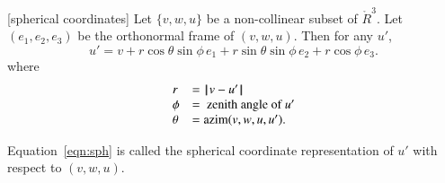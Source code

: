 \begin{lemma}[spherical coordinates]\label{lemma:sph}
Let $\{v,w,u\}$ %
be a non-collinear subset of $\ring{R}^3$.
Let $(e_1,e_2,e_3)$ be the orthonormal frame of $(v,w,u)$.
  Then for any $u'$,
   \begin{equation}
   u' = v + r \cos\theta \sin\phi\, e_1 + r \sin\theta\sin\phi\, e_2 +
   r\cos\phi\,e_3.
   \label{eqn:sph}
   \end{equation}
where
$$
\begin{array}{lll}
r &= {\hskip0.1em|\hskip-0.15em|\hskip0.1em}v  -  u'{\hskip0.1em|\hskip-0.15em|\hskip0.1em}\\
\phi &= \text{ zenith angle of } u'\\
\theta &={\operatorname{azim}}(v,w,u,u').
\end{array}
$$
\end{lemma}
%
%
%
%
%
%

\begin{definition}\label{def:sph}
Equation~\ref{eqn:sph} is called the spherical coordinate representation of
$u'$ with respect to $(v,w,u)$.   
\end{definition}
%
%
%
%

